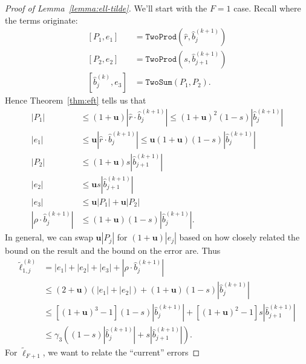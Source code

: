 \documentclass[3p, authoryear, square]{elsarticle}
\theoremstyle{definition}
\newcommand{\mach}{\mathbf{u}}
\begin{document}
\begin{proof}[Proof of Lemma~\ref{lemma:ell-tilde}]
We'll start with the \(F = 1\) case. Recall where the terms originate:
\begin{align}
\left[P_1, e_1\right] &= \mathtt{TwoProd}\left(\widehat{r},
  \widehat{b}_j^{(k + 1)}\right) \\
\left[P_2, e_2\right] &= \mathtt{TwoProd}\left(s,
  \widehat{b}_{j + 1}^{(k + 1)}\right) \\
\left[\widehat{b}_j^{(k)}, e_3\right] &= \mathtt{TwoSum}\left(P_1, P_2\right).
\end{align}
Hence Theorem~\ref{thm:eft} tells us that
\begin{align}
\left|P_1\right| &\leq (1 + \mach)\left|\widehat{r} \cdot
  \widehat{b}_j^{(k + 1)}\right| \leq (1 + \mach)^2 (1 - s)
  \left|\widehat{b}_j^{(k + 1)}\right| \\
\left|e_1\right| &\leq \mach \left|\widehat{r} \cdot
  \widehat{b}_j^{(k + 1)}\right| \leq \mach(1 + \mach)(1 - s) \left|
  \widehat{b}_j^{(k + 1)}\right| \\
\left|P_2\right| &\leq (1 + \mach) s \left|\widehat{b}_{j + 1}^{(k + 1)}\right| \\
\left|e_2\right| &\leq \mach s \left|\widehat{b}_{j + 1}^{(k + 1)}\right| \\
\left|e_3\right| &\leq \mach \left|P_1\right| + \mach\left|P_2\right| \\
\left|\rho \cdot \widehat{b}_j^{(k + 1)}\right| &\leq
(1 + \mach)(1 - s) \left|\widehat{b}_j^{(k + 1)}\right|.
\end{align}
In general, we can swap \(\mach\left|P_j\right|\) for
\((1 + \mach)\left|e_j\right|\) based on how closely related the bound
on the result and the bound on the error are. Thus
\begin{align}
\widetilde{\ell}_{1, j}^{(k)} &= \left|e_1\right| + \left|e_2\right| +
  \left|e_3\right| + \left|\rho \cdot \widehat{b}_j^{(k + 1)}\right| \\
&\leq (2 + \mach)\left(\left|e_1\right| + \left|e_2\right|\right) +
  (1 + \mach)(1 - s) \left|\widehat{b}_j^{(k + 1)}\right| \\
&\leq \left[(1 + \mach)^3 - 1\right] (1 - s) \left|
  \widehat{b}_j^{(k + 1)}\right| + \left[(1 + \mach)^2 - 1\right] s \left|
  \widehat{b}_{j + 1}^{(k + 1)}\right| \\
&\leq \gamma_3 \left((1 - s) \left|\widehat{b}_j^{(k + 1)}\right| +
  s \left|\widehat{b}_{j + 1}^{(k + 1)}\right|\right).
\end{align}
For \(\widetilde{\ell}_{F + 1}\), we want to relate the ``current'' errors

\end{proof}
\end{document}

